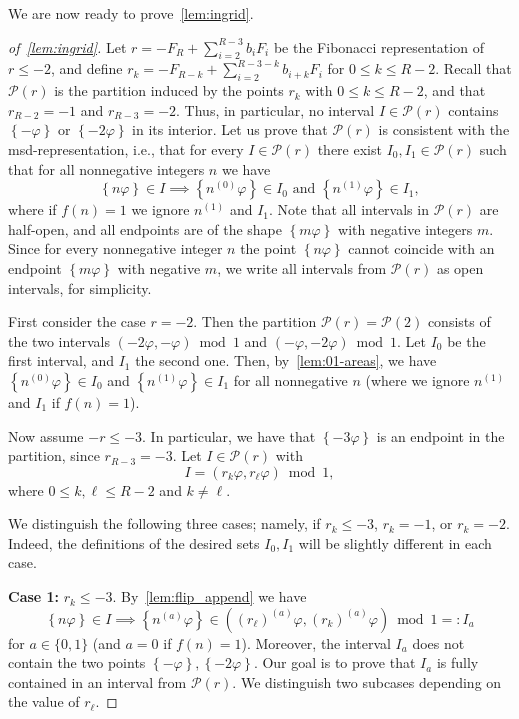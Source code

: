 \documentclass[12pt,runningheads]{llncs}
\newcommand{\cP}{\mathcal{P}}
\renewcommand{\phi}{\varphi}
\newcommand{\fract}[1]{\left\{ #1 \right\}}
\newcommand{\nzero}{n^{(0)}}
\newcommand{\none}{n^{(1)}}
\newcommand{\ndelta}{n^{(a)}}
\newcommand{\append}[2]{#1^{(#2)}}
\newcommand{\caseI}[1]{\medskip\noindent\textbf{Case #1:}}
\begin{document}
We are now ready to prove~\cref{lem:ingrid}.

\begin{proof}[of~\cref{lem:ingrid}] Let $r = - F_R + \sum_{i=2}^{R-3} b_i F_i$ be the Fibonacci representation of $r\leq -2$, and define $r_k= -F_{R-k} + \sum_{i=2}^{R-3-k} b_{i+k} F_{i}$ for $0\leq k \leq R-2$. 
Recall that $\cP(r)$ is the partition induced by the points $r_k$ with $0\leq k \leq R-2$, and that $r_{R-2} = -1$ and $r_{R-3} = -2$. 
Thus, in particular, no interval $I \in \cP(r)$ contains $\fract{-\phi}$ or $\fract{-2\phi}$ in its interior. Let us prove that $\cP(r)$ is consistent with the msd-representation, i.e., that for every $I\in \cP(r)$ there exist $I_0, I_1 \in \cP(r)$ such that for all nonnegative integers $n$ we have
\[
    \fract{n \phi} \in I 
    \implies 
    \fract{\nzero \phi} \in I_0 \text{ and } \fract{\none \phi} \in I_1,
\]
where if $f(n) = 1$ we ignore $\none$ and $I_1$.
Note that all intervals in $\cP(r)$ are half-open, and all endpoints are of the shape $\fract{m\phi}$ with negative integers $m$.
Since for every nonnegative integer $n$ the point $\fract{n\phi}$ cannot coincide with an endpoint $\fract{m\phi}$ with negative $m$, we write all intervals from $\cP(r)$ as open intervals, for simplicity.

First consider the case $r=-2$. Then the partition $\cP(r) = \cP(2)$ consists of the two intervals $(-2\phi,-\phi)\bmod 1$ and $(-\phi, -2\phi)\bmod 1$. Let $I_0$ be the first interval, and $I_1$ the second one. Then, by~\cref{lem:01-areas}, we have $\fract{\nzero\phi} \in I_0$ and $\fract{\none \phi} \in I_1$ for all nonnegative $n$ (where we ignore $\none$ and $I_1$ if $f(n) = 1$).

Now assume $-r\leq -3$. In particular, we have that $\fract{-3\phi}$ is an endpoint in the partition, since $r_{R-3}=-3$. 
Let $I \in \cP(r)$ with 
\[ I = (r_k \phi, r_\ell \phi) \bmod 1,
\]
where $0 \leq k,\ell \leq R-2$ and $k\neq \ell$.

We distinguish the  following three cases; namely, if $r_k\leq -3$, $r_k=-1$, or $r_k=-2$. Indeed, the definitions of the desired sets $I_0,I_1$ will be slightly different in each case.

\caseI{1} $r_k\leq -3$. By~\cref{lem:flip_append} we have
\[
    \fract{n\phi} \in I \implies
    \fract{\ndelta\phi} \in 
        \left(\append{(r_\ell)}{a} \phi, 
        \append{(r_k)}{a} \phi\right) \bmod 1
        =: I_a
\]
for $a \in \{0,1\}$ (and $a = 0$ if $f(n) = 1$).
Moreover, the interval $I_a$ does not contain the two points $\fract{-\phi}, \fract{-2\phi}$.
Our goal is to prove that $I_a$ is fully contained in an interval from $\cP(r)$. 
We distinguish two subcases depending on the value of $r_\ell$. 


\end{proof}
\end{document}
